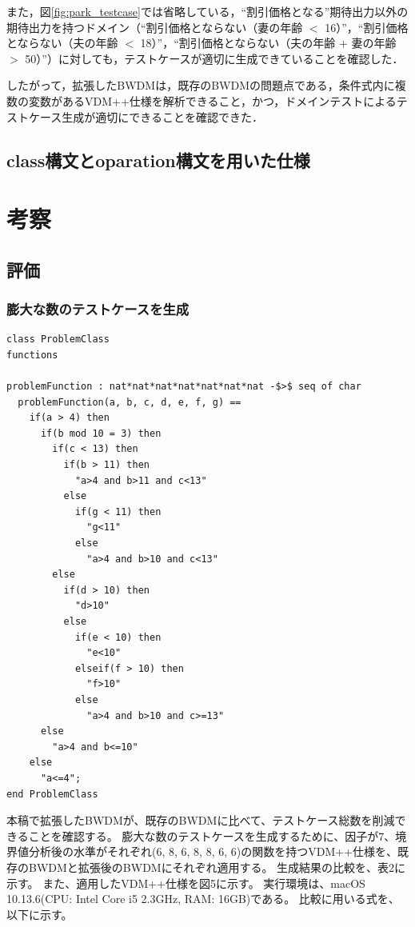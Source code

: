\documentclass[uplatex, report, a4j, 10pt]{jsbook}
\begin{document}
また，図\ref{fig:park_testcase}では省略している，“割引価格となる”期待出力以外の期待出力を持つドメイン（“割引価格とならない（妻の年齢 $<$ 16）”，“割引価格とならない（夫の年齢 $<$ 18）”，“割引価格とならない（夫の年齢 + 妻の年齢 $>$ 50）”）に対しても，テストケースが適切に生成できていることを確認した．

したがって，拡張したBWDMは，既存のBWDMの問題点である，条件式内に複数の変数があるVDM++仕様を解析できること，かつ，ドメインテストによるテストケース生成が適切にできることを確認できた．


\section{class構文とoparation構文を用いた仕様}

\chapter{考察}\label{cha:Evaluation}
\section{評価}
\subsection{膨大な数のテストケースを生成}
\lstset{language=}
\noindent\begin{minipage}{\textwidth}
\begin{lstlisting}[caption=因子が7、水準が（6 8 6 8 8 6 6）の関数を持つVDM++仕様。,label=fig:pict4javaIndication]
class ProblemClass
functions

problemFunction : nat*nat*nat*nat*nat*nat*nat -$>$ seq of char
  problemFunction(a, b, c, d, e, f, g) ==
    if(a > 4) then
      if(b mod 10 = 3) then
        if(c < 13) then
          if(b > 11) then
            "a>4 and b>11 and c<13"
          else
            if(g < 11) then
              "g<11"
            else
              "a>4 and b>10 and c<13"
        else
          if(d > 10) then
            "d>10"
          else
            if(e < 10) then
              "e<10"
            elseif(f > 10) then
              "f>10"
            else
              "a>4 and b>10 and c>=13"
      else
        "a>4 and b<=10"
    else
      "a<=4";
end ProblemClass
\end{lstlisting}
\end{minipage}

本稿で拡張したBWDMが、既存のBWDMに比べて、テストケース総数を削減できることを確認する。
膨大な数のテストケースを生成するために、因子が7、境界値分析後の水準がそれぞれ(6, 8, 6, 8, 8, 6, 6)の関数を持つVDM++仕様を、既存のBWDMと拡張後のBWDMにそれぞれ適用する。
生成結果の比較を、表2に示す。
また、適用したVDM++仕様を図5に示す。
実行環境は、macOS 10.13.6(CPU: Intel Core i5 2.3GHz, RAM: 16GB)である。
比較に用いる式を、以下に示す。
\end{document}
